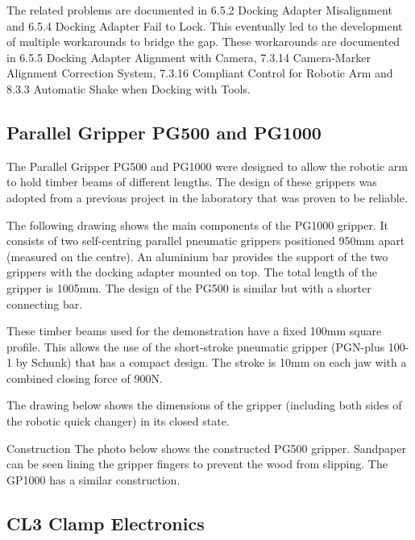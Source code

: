 The related problems are documented in 6.5.2 Docking Adapter Misalignment and 6.5.4 Docking Adapter Fail to Lock. This eventually led to the development of multiple workarounds to bridge the gap. These workarounds are documented in 6.5.5 Docking Adapter Alignment with Camera, 7.3.14 Camera-Marker Alignment Correction System, 7.3.16 Compliant Control for Robotic Arm and 8.3.3 Automatic Shake when Docking with Tools. 

\subsection{Parallel Gripper PG500 and PG1000}
\label{subsection:exploration_2_parallel_gripper_pg500_and_pg1000}

The Parallel Gripper PG500 and PG1000 were designed to allow the robotic arm to hold timber beams of different lengths. The design of these grippers was adopted from a previous project in the laboratory that was proven to be reliable. 

The following drawing shows the main components of the PG1000 gripper. It consists of two self-centring parallel pneumatic grippers positioned 950mm apart (measured on the centre). An aluminium bar provides the support of the two grippers with the docking adapter mounted on top. The total length of the gripper is 1005mm. The design of the PG500 is similar but with a shorter connecting bar. 

These timber beams used for the demonstration have a fixed 100mm square profile. This allows the use of the short-stroke pneumatic gripper (PGN-plus 100-1 by Schunk) that has a compact design. The stroke is 10mm on each jaw with a combined closing force of 900N. 

The drawing below shows the dimensions of the gripper (including both sides of the robotic quick changer) in its closed state. 

Construction
The photo below shows the constructed PG500 gripper. Sandpaper can be seen lining the gripper fingers to prevent the wood from slipping. The GP1000 has a similar construction. 

\subsection{CL3 Clamp Electronics}
\label{subsection:exploration_2_cl3_clamp_electronics}

